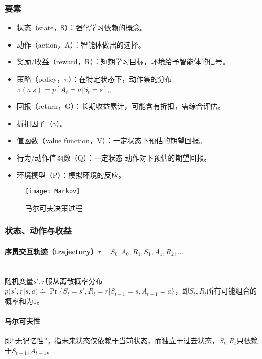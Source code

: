 \documentclass[
12pt, %
a4paper, 
oneside, %
headinclude,footinclude, %
]{scrartcl}
\begin{document}
\subsubsection[要素]{要素}
\begin{itemize}
\item 状态（state，S）：强化学习依赖的概念。
\item 动作（action，A）：智能体做出的选择。
\item 奖励/收益（reward，R）：短期学习目标，环境给予智能体的信号。
\item 策略（policy，$ \pi $）：在特定状态下，动作集的分布$ \pi(a|s) = p[A_t = a|S_t = s] $。
\item 回报（return，G）：长期收益累计，可能含有折扣，需综合评估。
\item 折扣因子（$ \gamma $）。
\item 值函数（value function，V）：一定状态下预估的期望回报。
\item 行为/动作值函数（Q）：一定状态-动作对下预估的期望回报。
\item 环境模型（P）：模拟环境的反应。
\end{itemize}

\begin{figure}[H]
\centering 
\texttt{[image: Markov]} 
\caption[马尔可夫决策过程]{马尔可夫决策过程}
\end{figure}
\subsubsection[状态、动作与收益]{状态、动作与收益}
\paragraph{序贯交互轨迹（trajectory）$ \tau =  S_0, A_0, R_1, S_1, A_1, R_2, \dots $}~\\

随机变量$ s',r $服从离散概率分布$ p(s', r|s, a) \doteq \Pr\{S_t = s', R_t = r|S_{t - 1} = s, A_{t - 1} = a\} $，即$ S_t,R_t $所有可能组合的概率和为1。
\paragraph{马尔可夫性}
即“无记忆性”，指未来状态仅依赖于当前状态，而独立于过去状态，$ S_t,R_t $只依赖于$ S_{t - 1},A_{t - 1} $。
\end{document}
